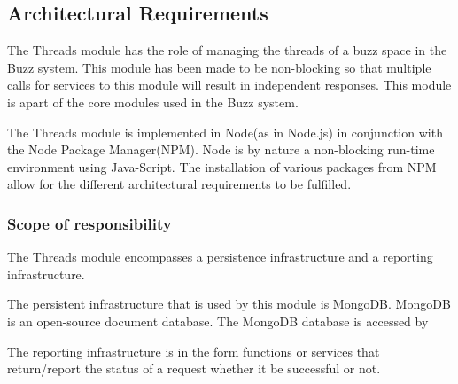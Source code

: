 \subsection{Architectural Requirements}
\begin{flushleft}

The Threads module has the role of managing the threads of a buzz space in the Buzz system. This module has been made to be non-blocking so that multiple calls for services to this module will result in independent responses. This module is apart of the core modules used in the Buzz system.

The Threads module is implemented in Node(as in Node.js) in conjunction with the Node Package Manager(NPM). Node is by nature a non-blocking run-time environment using Java-Script. The installation of various packages from NPM allow for the different architectural requirements to be fulfilled. 

\subsubsection{Scope of responsibility}
The Threads module encompasses a persistence infrastructure and a reporting infrastructure. 

The persistent infrastructure that is used by this module is MongoDB. MongoDB is an open-source document database. The MongoDB database is accessed by

The reporting infrastructure is in the form functions or services that return/report the status of a request whether it be successful or not.


\end{flushleft}
